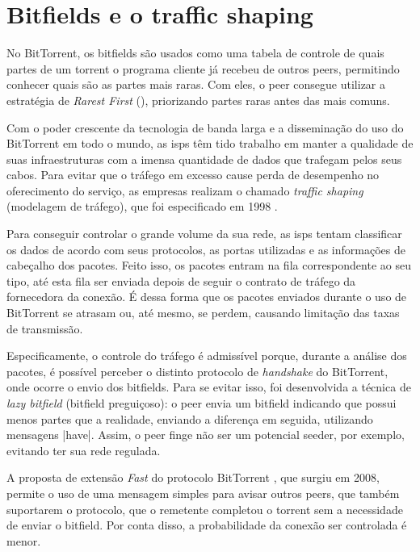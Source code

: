 
\section{Bitfields e o traffic shaping}
\label{sec:bitfield}

No BitTorrent, os bitfields são usados como uma tabela de controle de quais partes de um
\gls*{torrent} o programa cliente já recebeu de outros \glspl*{peer}, permitindo
conhecer quais são as partes mais raras. Com eles, o \gls*{peer} consegue utilizar a
estratégia de \emph{Rarest First} (\pageref{subsubsec:rarest-first}), priorizando
partes raras antes das mais comuns.

Com o poder crescente da tecnologia de banda larga e a disseminação do uso do
BitTorrent em todo o mundo, as \glspl{isp} têm tido trabalho em manter a qualidade de
suas infraestruturas com a imensa quantidade de dados que trafegam pelos seus cabos.
Para evitar que o tráfego em excesso cause perda de desempenho no oferecimento do
serviço, as empresas realizam o chamado \emph{traffic shaping} (modelagem de tráfego),
que foi especificado em 1998 \cite{site:rfcshaping}.

Para conseguir controlar o grande volume da sua rede, as \glspl*{isp} tentam
classificar os dados de acordo com seus protocolos, as portas utilizadas e as
informações de cabeçalho dos pacotes. Feito isso, os pacotes entram na fila
correspondente ao seu tipo, até esta fila ser enviada depois de seguir o contrato de
tráfego da fornecedora da conexão. É dessa forma que os pacotes enviados durante o uso
de BitTorrent se atrasam ou, até mesmo, se perdem, causando limitação das taxas de
transmissão.

Especificamente, o controle do tráfego é admissível porque, durante a análise dos
pacotes, é possível perceber o distinto protocolo de \emph{handshake} do BitTorrent,
onde ocorre o envio dos bitfields. Para se evitar isso, foi desenvolvida a técnica de
\emph{lazy bitfield} (bitfield preguiçoso): o \gls*{peer} envia um bitfield indicando
que possui menos partes que a realidade, enviando a diferença em seguida, utilizando
mensagens \bverb|have|. Assim, o \gls*{peer} finge não ser um potencial \gls{seeder},
por exemplo, evitando ter sua rede regulada.

A proposta de extensão \emph{Fast} do protocolo BitTorrent \cite{site:bittorrent-fast},
que surgiu em 2008, permite o uso de uma mensagem simples para avisar outros
\glspl*{peer}, que também suportarem o protocolo, que o remetente completou o
\gls*{torrent} sem a necessidade de enviar o bitfield. Por conta disso, a probabilidade
da conexão ser controlada é menor.